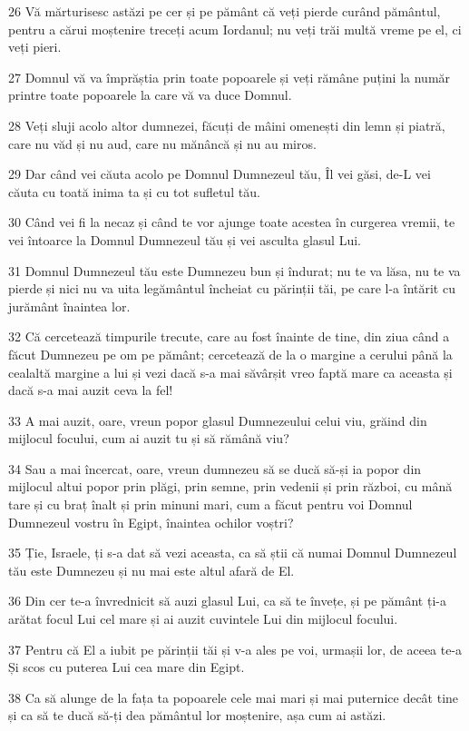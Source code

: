 \par 26 Vă mărturisesc astăzi pe cer și pe pământ că veți pierde curând pământul, pentru a cărui moștenire treceți acum Iordanul; nu veți trăi multă vreme pe el, ci veți pieri.
\par 27 Domnul vă va împrăștia prin toate popoarele și veți rămâne puțini la număr printre toate popoarele la care vă va duce Domnul.
\par 28 Veți sluji acolo altor dumnezei, făcuți de mâini omenești din lemn și piatră, care nu văd și nu aud, care nu mănâncă și nu au miros.
\par 29 Dar când vei căuta acolo pe Domnul Dumnezeul tău, Îl vei găsi, de-L vei căuta cu toată inima ta și cu tot sufletul tău.
\par 30 Când vei fi la necaz și când te vor ajunge toate acestea în curgerea vremii, te vei întoarce la Domnul Dumnezeul tău și vei asculta glasul Lui.
\par 31 Domnul Dumnezeul tău este Dumnezeu bun și îndurat; nu te va lăsa, nu te va pierde și nici nu va uita legământul încheiat cu părinții tăi, pe care l-a întărit cu jurământ înaintea lor.
\par 32 Că cercetează timpurile trecute, care au fost înainte de tine, din ziua când a făcut Dumnezeu pe om pe pământ; cercetează de la o margine a cerului până la cealaltă margine a lui și vezi dacă s-a mai săvârșit vreo faptă mare ca aceasta și dacă s-a mai auzit ceva la fel!
\par 33 A mai auzit, oare, vreun popor glasul Dumnezeului celui viu, grăind din mijlocul focului, cum ai auzit tu și să rămână viu?
\par 34 Sau a mai încercat, oare, vreun dumnezeu să se ducă să-și ia popor din mijlocul altui popor prin plăgi, prin semne, prin vedenii și prin război, cu mână tare și cu braț înalt și prin minuni mari, cum a făcut pentru voi Domnul Dumnezeul vostru în Egipt, înaintea ochilor voștri?
\par 35 Ție, Israele, ți s-a dat să vezi aceasta, ca să știi că numai Domnul Dumnezeul tău este Dumnezeu și nu mai este altul afară de El.
\par 36 Din cer te-a învrednicit să auzi glasul Lui, ca să te învețe, și pe pământ ți-a arătat focul Lui cel mare și ai auzit cuvintele Lui din mijlocul focului.
\par 37 Pentru că El a iubit pe părinții tăi și v-a ales pe voi, urmașii lor, de aceea te-a Și scos cu puterea Lui cea mare din Egipt.
\par 38 Ca să alunge de la fața ta popoarele cele mai mari și mai puternice decât tine și ca să te ducă să-ți dea pământul lor moștenire, așa cum ai astăzi.
